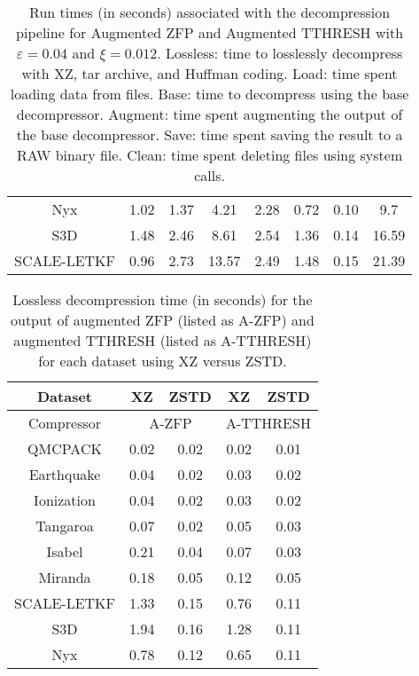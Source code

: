 \begin{table}[!ht]
\begin{tabular}{cccccccc}
\multicolumn{1}{c|}{Nyx}         & 1.02     & 1.37 & 4.21  & 2.28    & 0.72 & 0.10  & 9.7   \\
\multicolumn{1}{c|}{S3D}         & 1.48     & 2.46 & 8.61  & 2.54    & 1.36 & 0.14  & 16.59 \\
\multicolumn{1}{c|}{SCALE-LETKF} & 0.96     & 2.73 & 13.57 & 2.49    & 1.48 & 0.15  & 21.39 \\ \hline
\end{tabular}
\vspace{-2mm}
\caption{Run times (in seconds) associated with the decompression pipeline for Augmented ZFP and Augmented TTHRESH with $\varepsilon = 0.04$ and $\xi = 0.012$.  
Lossless: time to losslessly decompress with XZ, tar archive, and Huffman coding.
Load: time spent loading data from files.
Base: time to decompress using the base decompressor.
Augment: time spent augmenting the output of the base decompressor.
Save: time spent saving the result to a RAW binary file.
Clean: time spent deleting files using system calls.}
\label{tab:decompression-time}
\end{table}

\begin{table}[!ht]
\setlength{\tabcolsep}{2pt}
\centering
\begin{tabular}{c|cc|cc}
\hline
Dataset     & XZ               & ZSTD             & XZ                & ZSTD              \\ \hline
Compressor  & \multicolumn{2}{c|}{A-ZFP} & \multicolumn{2}{c}{A-TTHRESH} \\ \hline
QMCPACK     & 0.02             & 0.02             & 0.02              & 0.01              \\
Earthquake  & 0.04             & 0.02             & 0.03              & 0.02              \\
Ionization  & 0.04             & 0.02             & 0.03              & 0.02              \\
Tangaroa    & 0.07             & 0.02             & 0.05              & 0.03              \\
Isabel      & 0.21             & 0.04             & 0.07              & 0.03              \\
Miranda     & 0.18             & 0.05             & 0.12              & 0.05              \\
SCALE-LETKF & 1.33             & 0.15             & 0.76              & 0.11              \\
S3D         & 1.94             & 0.16             & 1.28              & 0.11              \\
Nyx         & 0.78             & 0.12             & 0.65              & 0.11              \\ \hline
\end{tabular}
\vspace{-2mm}
\caption{Lossless decompression time (in seconds) for the output of augmented ZFP (listed as A-ZFP) and augmented TTHRESH (listed as A-TTHRESH) for each dataset using XZ versus ZSTD.}
\label{tab:XZ-versus-ZSTD}
\vspace{-6mm}
\end{table}